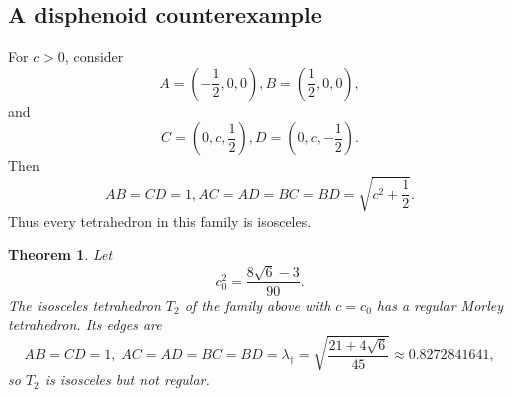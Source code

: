 \documentclass[11pt]{article}
\newtheorem{theorem}{Theorem}[section]
\theoremstyle{definition}
\theoremstyle{remark}
\begin{document}
\subsection{A disphenoid counterexample}

For $c>0$, consider
\[
A=\left(-\frac12,0,0\right), B=\left(\frac12,0,0\right),
\]
and
\[
C=\left(0,c,\frac12\right), D=\left(0,c,-\frac12\right).
\]
Then
\[
AB=CD=1,
AC=AD=BC=BD= \sqrt{c^2+\frac12}.
\]
Thus every tetrahedron in this family is isosceles.

\begin{theorem}
\label{thm:T2} Let
\[
c_0^2=\frac{8\sqrt6-3}{90}.
\]
The isosceles tetrahedron $T_2$ of the family above with $c=c_0$ has a regular Morley tetrahedron. Its edges are
\[
AB=CD=1,\;
AC=AD=BC=BD=\lambda_\dagger=\sqrt{\frac{21+4\sqrt6}{45}}\approx0.8272841641,
\]
so $T_2$ is isosceles but not regular.
\end{theorem}
\end{document}
